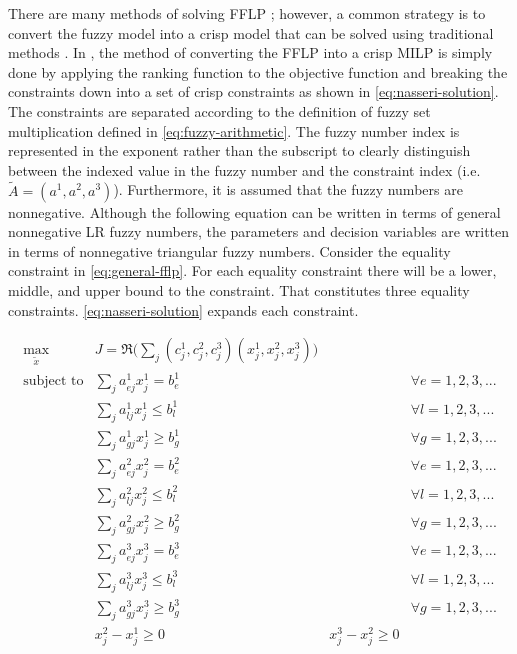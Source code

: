 \documentclass[ee,thesis]{usuthesis}
\begin{document}
There are many methods of solving FFLP
\cite{bello-2019-fuzzy-activ,kaur-2016-introd-fuzzy,ebrahimnejad-2016-new-method,nasseri-2013-fully}; however, a
common strategy is to convert the fuzzy model into a crisp model that can be solved using traditional methods
\cite{bello-2019-fuzzy-activ}. In \cite{nasseri-2013-fully,bello-2019-fuzzy-activ}, the method of converting the FFLP
into a crisp MILP is simply done by applying the ranking function to the objective function and breaking the constraints
down into a set of crisp constraints as shown in \ref{eq:nasseri-solution}. The constraints are separated according to the
definition of fuzzy set multiplication defined in \ref{eq:fuzzy-arithmetic}. The fuzzy number index is represented in the
exponent rather than the subscript to clearly distinguish between the indexed value in the fuzzy number and the
constraint index (i.e. \(\tilde{A} = (a^1,a^2,a^3)\)). Furthermore, it is assumed that the fuzzy numbers are nonnegative.
Although the following equation can be written in terms of general nonnegative LR fuzzy numbers, the parameters and
decision variables are written in terms of nonnegative triangular fuzzy numbers. Consider the equality constraint in
\ref{eq:general-fflp}. For each equality constraint there will be a lower, middle, and upper bound to the constraint. That
constitutes three equality constraints. \ref{eq:nasseri-solution} expands each constraint.

\begin{equation}
\label{eq:nasseri-solution}
\begin{array}{lclc}
\underset{{\tilde{x}}}{\text{max}}   & J = \mathfrak{R}\Big(\sum_j (c_j^1,c_j^2,c_j^3)(x_j^1,x_j^2,x_j^3)\Big) &\\
\text{subject to} & \sum_j a_{ej}^1 x_j^1 = b_e^1 & & \forall e = 1,2,3,... \\
                  & \sum_j a_{lj}^1 x_j^1 \le b_l^1 & & \forall l = 1,2,3,... \\
                  & \sum_j a_{gj}^1 x_j^1 \ge b_g^1  & & \forall g = 1,2,3,... \\
                  & \sum_j a_{ej}^2 x_j^2 = b_e^2 & & \forall e = 1,2,3,... \\
                  & \sum_j a_{lj}^2 x_j^2 \le b_l^2 & & \forall l = 1,2,3,... \\
                  & \sum_j a_{gj}^2 x_j^2 \ge b_g^2  & & \forall g = 1,2,3,... \\
                  & \sum_j a_{ej}^3 x_j^3 = b_e^3 & & \forall e = 1,2,3,... \\
                  & \sum_j a_{lj}^3 x_j^3 \le b_l^3 & & \forall l = 1,2,3,... \\
                  & \sum_j a_{gj}^3 x_j^3 \ge b_g^3  & & \forall g = 1,2,3,... \\
                  & x_j^2 - x_j^1 \ge 0         & x_j^3 - x_j^2 \ge 0 & \\
\end{array}
\end{equation}
\end{document}
